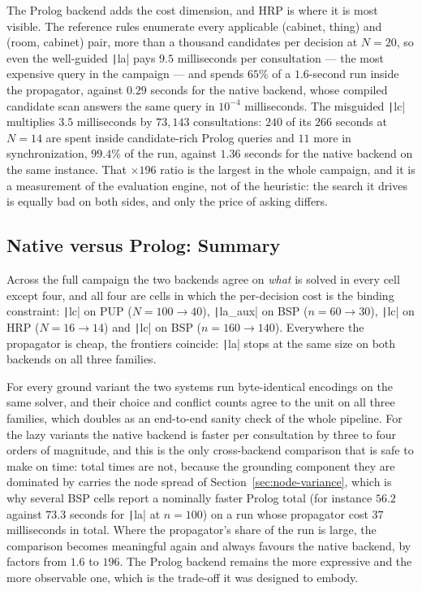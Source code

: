The Prolog backend adds the cost dimension, and HRP is where it is most visible. The reference rules enumerate every applicable (cabinet, thing) and (room, cabinet) pair, more than a thousand candidates per decision at $N=20$, so even the well-guided \texttt|la| pays $9.5$ milliseconds per consultation --- the most expensive query in the campaign --- and spends $65\%$ of a $1.6$-second run inside the propagator, against $0.29$ seconds for the native backend, whose compiled candidate scan answers the same query in $10^{-4}$ milliseconds. The misguided \texttt|lc| multiplies $3.5$ milliseconds by $73{,}143$ consultations: $240$ of its $266$ seconds at $N=14$ are spent inside candidate-rich Prolog queries and $11$ more in synchronization, $99.4\%$ of the run, against $1.36$ seconds for the native backend on the same instance. That $\times 196$ ratio is the largest in the whole campaign, and it is a measurement of the evaluation engine, not of the heuristic: the search it drives is equally bad on both sides, and only the price of asking differs.

\subsection{Native versus Prolog: Summary}
\label{sec:backend-summary}

Across the full campaign the two backends agree on \emph{what} is solved in every cell except four, and all four are cells in which the per-decision cost is the binding constraint: \texttt|lc| on PUP ($N=100\to40$), \texttt|la_aux| on BSP ($n=60\to30$), \texttt|lc| on HRP ($N=16\to14$) and \texttt|lc| on BSP ($n=160\to140$). Everywhere the propagator is cheap, the frontiers coincide: \texttt|la| stops at the same size on both backends on all three families.

For every ground variant the two systems run byte-identical encodings on the same solver, and their choice and conflict counts agree to the unit on all three families, which doubles as an end-to-end sanity check of the whole pipeline. For the lazy variants the native backend is faster per consultation by three to four orders of magnitude, and this is the only cross-backend comparison that is safe to make on time: total times are not, because the grounding component they are dominated by carries the node spread of Section~\ref{sec:node-variance}, which is why several BSP cells report a nominally faster Prolog total (for instance $56.2$ against $73.3$ seconds for \texttt|la| at $n=100$) on a run whose propagator cost $37$ milliseconds in total. Where the propagator's share of the run is large, the comparison becomes meaningful again and always favours the native backend, by factors from $1.6$ to $196$. The Prolog backend remains the more expressive and the more observable one, which is the trade-off it was designed to embody.

